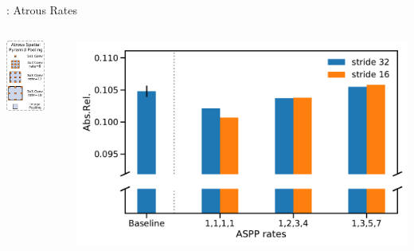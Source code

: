 \documentclass[11pt]{beamer}
\begin{document}
\begin{frame}[c]{\subsecname: Atrous Rates}
    \begin{columns}
            \begin{column}{0.3\textwidth}
            \centering
            \includegraphics[width=0.7\textwidth]{figures/architecture/aspp-module.pdf}
            \end{column}%
            \pause
            \begin{column}{0.8\textwidth}
            \centering
  \includegraphics[width=1.0\textwidth]{figures/results/experiment1_AbsRel.pdf}
            \end{column}
    \end{columns}
  
\end{frame}
\end{document}
